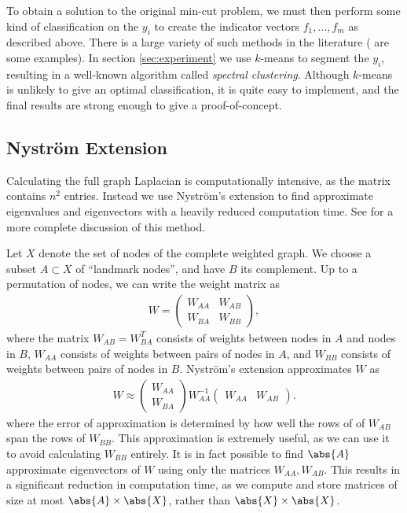 \documentclass{article}
\begin{document}
To obtain a solution to the original min-cut problem, we must then perform some
kind of classification on the $y_i$ to create the indicator vectors
$f_1,\ldots,f_m$ as described above. There is a large variety of such methods in
the literature (\cite{Hu2015,Merkurjev13} are some examples). In section
\ref{sec:experiment} we use $k$-means to segment the $y_i$, resulting in a
well-known algorithm called \emph{spectral clustering}. Although $k$-means is
unlikely to give an optimal classification, it is quite easy to implement, and
the final results are strong enough to give a proof-of-concept.

\subsection{Nystr\"{o}m Extension}\label{sec:Nystrom}
Calculating the full graph Laplacian is computationally intensive, as the matrix
contains $n^2$ entries. Instead we use Nystr\"{o}m's extension to find
approximate eigenvalues and eigenvectors with a heavily reduced computation
time. See \cite{Fowlkes04, Merkurjev13, Woodworth13} for a more complete
discussion of this method.

Let $X$ denote the set of nodes of the complete weighted graph. We choose a
subset $A\subset X$ of ``landmark nodes'', and have $B$ its complement. Up to a
permutation of nodes, we can write the weight matrix as
\begin{align}
  W = \begin{pmatrix} W_{AA} & W_{AB} \\ W_{BA} & W_{BB}
  \end{pmatrix},
\end{align}
where the matrix $W_{AB} = W_{BA}^T$ consists of weights between nodes in $A$
and nodes in $B$, $W_{AA}$ consists of weights between pairs of nodes in $A$,
and $W_{BB}$ consists of weights between pairs of nodes in $B$. Nystr\"{o}m's
extension approximates $W$ as
\begin{align}
  W \approx \begin{pmatrix} W_{AA} \\ W_{BA} \end{pmatrix}
  W_{AA}^{-1} \begin{pmatrix} W_{AA} & W_{AB}\end{pmatrix}.
\end{align}
where the error of approximation is determined by how well the rows of of
$W_{AB}$ span the rows of $W_{BB}$.
This approximation is extremely useful, as we can use it to avoid calculating
$W_{BB}$ entirely. It is in fact possible to find $\abs{A}$ approximate
eigenvectors of $W$ using only the matrices $W_{AA},W_{AB}$. This results in a
significant reduction in computation time, as we compute and store matrices of
size at most $\abs{A}\times\abs{X}$, rather than $\abs{X}\times\abs{X}$.
\end{document}
